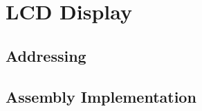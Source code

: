 \newpage

\section{LCD Display}

    \subsection{Addressing}

    \subsection{Assembly Implementation}